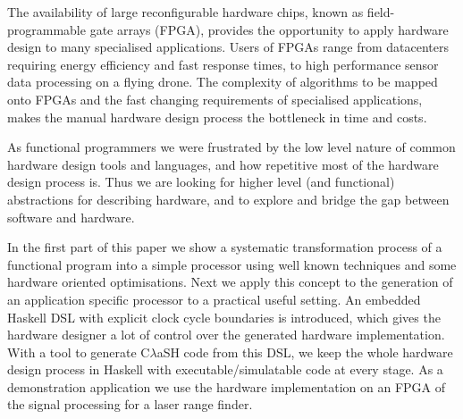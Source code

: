 \documentclass[preprint]{sigplanconf}
\def\clash{C$\lambda$aSH\xspace}
\begin{document}
The availability of large reconfigurable hardware chips, known as field-programmable gate arrays (FPGA), provides the opportunity to apply hardware design to many specialised applications.
Users of FPGAs range from datacenters requiring energy efficiency and fast response times, to high performance sensor data processing on a flying drone.
The complexity of algorithms to be mapped onto FPGAs and the fast changing requirements of specialised applications, makes the manual hardware design process the bottleneck in time and costs.

As functional programmers we were frustrated by the low level nature of common hardware design tools and languages, and how repetitive most of the hardware design process is.
Thus we are looking for higher level (and functional) abstractions for describing hardware, and to explore and bridge the gap between software and hardware.

In the first part of this paper we show a systematic transformation process of a functional program into a simple processor using well known techniques and some hardware oriented optimisations.
Next we apply this concept to the generation of an application specific processor to a practical useful setting.
An embedded Haskell DSL with explicit clock cycle boundaries is introduced, which gives the hardware designer a lot of control over the generated hardware implementation.
With a tool to generate \clash code from this DSL, we keep the whole hardware design process in Haskell with executable/simulatable code at every stage.
As a demonstration application we use the hardware implementation on an FPGA of the signal processing for a laser range finder.
\end{document}
